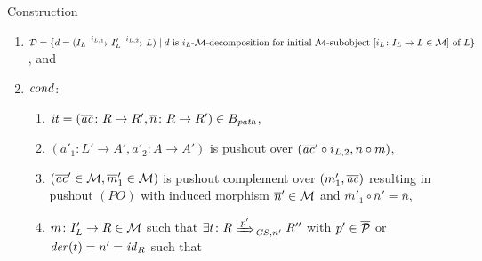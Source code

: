 \begin{paragraph}{Construction}
\begin{center}
\end{center}
\begin{enumerate}
  \item \label{item:sec-compl-software-trans:weakened_lang:1}$\mathcal{D}=\{d=(I_L \trans{i_{L,1}} I'_L \trans{i_{L,2}} L) \mid d \text{ is } i_L \text{-} \M \text{-decomposition for initial } \M \text{-subobject } [i_L\colon I_L \to L \in \M] \text{ of } L\}$, and
  \item $\mathit{cond}$:
  \begin{enumerate}
    \item \label{item:sec-compl-software-trans:weakened_lang:2a}$\mathit{it}=(\overline{\mathit{ac}}\colon R \to R',\overline{n}\colon R \to R') \in B_\mathit{path}$,
	\item \label{item:sec-compl-software-trans:weakened_lang:2b}$(a'_1\colon L' \to A',a'_2\colon A \to A')$ is pushout over $(\overline{\mathit{ac}}' \circ i_{L,2},n \circ m)$,
    \item \label{item:sec-compl-software-trans:weakened_lang:2c}$(\overline{\mathit{ac}}' \in {\cal M},\overline{m}'_1 \in {\cal M})$ is pushout complement over $(m'_1,\overline{\mathit{ac}})$ resulting in pushout $(PO)$ with induced morphism $\overline{n}' \in {\cal M}$ and $\overline{m}'_1 \circ \overline{n}'=\overline{n}$, 
    \item \label{item:sec-compl-software-trans:weakened_lang:2e}$m\colon I'_L \to R \in {\cal M}$ such that $\exists t\colon R \Trans{p'}_{\GS,n'} R''$ with $p' \in \overline{{\cal P}}$ or $\mathit{der}(t)=n'=\mathit{id}_R$ such that
  \end{enumerate}
\end{enumerate}
\end{paragraph}

